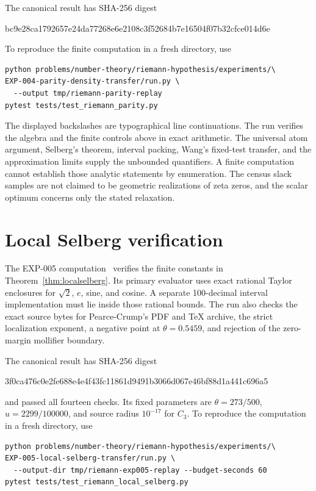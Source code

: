 ﻿\documentclass[11pt]{article}
\theoremstyle{remark}
\begin{document}
The canonical result has SHA-256 digest
\begin{center}\small\ttfamily
bc9e28ca1792657e24da77268e6e2108c3f52684b7e16504f07b32cfce014d6e
\end{center}
To reproduce the finite computation in a fresh directory, use
\begin{verbatim}
python problems/number-theory/riemann-hypothesis/experiments/\
EXP-004-parity-density-transfer/run.py \
  --output tmp/riemann-parity-replay
pytest tests/test_riemann_parity.py
\end{verbatim}
The displayed backslashes are typographical line continuations. The run
verifies the algebra and the finite controls above in exact arithmetic. The
universal atom argument, Selberg's theorem, interval packing, Wang's
fixed-test transfer, and the approximation limits supply the unbounded
quantifiers. A finite computation cannot establish those analytic
statements by enumeration.
The census slack samples are not claimed to be geometric realizations of
zeta zeros, and the scalar optimum concerns only the stated relaxation.

\section{Local Selberg verification}

The EXP-005 computation~\cite{RecordV} verifies the finite constants in
Theorem~\ref{thm:localselberg}. Its primary evaluator uses exact rational
Taylor enclosures for $\sqrt2$, $e$, sine, and cosine. A separate
100-decimal interval implementation must lie inside those rational bounds.
The run also checks the exact source bytes for Pearce-Crump's PDF and TeX
archive, the strict localization exponent, a negative point at
$\theta=0.5459$, and rejection of the zero-margin mollifier boundary.

The canonical result has SHA-256 digest
\begin{center}\small\ttfamily
3f0ca476c0e2fe688e4e4f43fc11861d9491b3066d067e46bf88d1a441c696a5
\end{center}
and passed all fourteen checks. Its fixed parameters are
$\theta=273/500$, $u=2299/100000$, and source radius $10^{-17}$ for
$C_3$. To reproduce the computation in a fresh directory, use
\begin{verbatim}
python problems/number-theory/riemann-hypothesis/experiments/\
EXP-005-local-selberg-transfer/run.py \
  --output-dir tmp/riemann-exp005-replay --budget-seconds 60
pytest tests/test_riemann_local_selberg.py
\end{verbatim}
\end{document}
